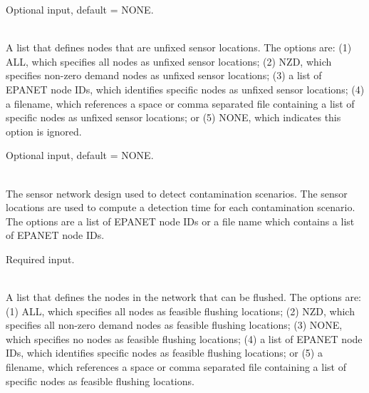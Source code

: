 \begin{description}[topsep=0pt,parsep=0.5em,itemsep=-0.4em]
\begin{description}[topsep=0pt,parsep=0.5em,itemsep=-0.4em]
\begin{description}[topsep=0pt,parsep=0.5em,itemsep=-0.4em]
                Optional input, default = NONE.
      \item[{unfixed nodes}]\hfill
\\A list that defines nodes that are unfixed sensor locations.
                The options are:
                (1) ALL, which specifies all nodes as unfixed sensor locations;
                (2) NZD, which specifies non-zero demand nodes as unfixed sensor locations;
                (3) a list of EPANET node IDs, which identifies specific nodes as unfixed sensor locations; 
                (4) a filename, which references a space or comma separated file containing a list of 
                specific nodes as unfixed sensor locations; or
                (5) NONE, which indicates this option is ignored.
                
                Optional input, default = NONE.
    \end{description}
  \end{description}
  \item[{flushing}]\hfill
  \begin{description}[topsep=0pt,parsep=0.5em,itemsep=-0.4em]
    \item[{detection}]\hfill
\\The sensor network design used to detect contamination scenarios. The
                sensor locations are used to compute a detection time for each 
                contamination scenario. The options are a list of 
                EPANET node IDs or a file name which contains a list of EPANET node IDs.
                
                Required input.
    \item[{flush nodes}]\hfill
    \begin{description}[topsep=0pt,parsep=0.5em,itemsep=-0.4em]
      \item[{feasible nodes}]\hfill
\\A list that defines the nodes in the network that can be flushed. 
                The options are: (1) ALL, which specifies all nodes as feasible flushing locations;
                (2) NZD, which specifies all non-zero demand nodes as feasible flushing locations;
                (3) NONE, which specifies no nodes as feasible flushing locations;
                (4) a list of EPANET node IDs, which identifies specific nodes as feasible flushing locations; or
                (5) a filename, which references a space or comma separated file containing a list of 
                specific nodes as feasible flushing locations.
                

\end{description}
\end{description}
\end{description}
